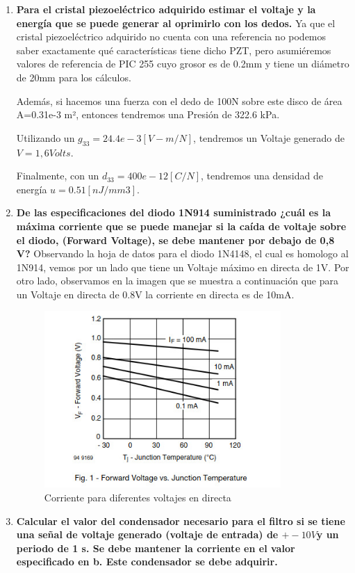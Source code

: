 \documentclass[journal,transmag]{IEEEtran}
\begin{document}
\begin{enumerate}[]
  \item \textbf{Para el cristal piezoeléctrico adquirido estimar el voltaje y la energía que se puede generar al oprimirlo con los dedos.}
Ya que el cristal piezoeléctrico adquirido no cuenta con una referencia no podemos saber exactamente qué características tiene dicho PZT, pero asumiéremos valores de referencia de PIC 255 cuyo grosor es de 0.2mm y tiene un diámetro de 20mm para los cálculos.  

Además, si hacemos una fuerza con el dedo de 100N sobre este disco de área A=0.31e-3 m², entonces tendremos una Presión de 322.6 kPa.  

Utilizando un $g_33= 24.4e-3 [V-m/N] $,  tendremos un Voltaje generado de $V=1,6 Volts$. 

Finalmente, con un $d_33=400e-12 [C/N]$, tendremos una densidad de energía $u= 0.51 [nJ/mm3]$. 

  \item \textbf{De las especificaciones del diodo 1N914 suministrado ¿cuál es la máxima corriente que se puede manejar si la caída de voltaje sobre el diodo, (Forward Voltage), se debe mantener por debajo de 0,8 V?}
Observando la hoja de datos para el diodo 1N4148, el cual es homologo al 1N914, vemos por un lado que tiene un Voltaje máximo en directa de 1V. Por otro lado, observamos en la imagen que se muestra a continuación que para un Voltaje en directa de 0.8V la corriente en directa es de 10mA. 

\begin{figure}[!h]
    \center
    \includegraphics[width=9cm]{imgs/s1.jpeg}
    \caption{Corriente para diferentes voltajes en directa}
    \label{1}
\end{figure}

  \item \textbf{Calcular el valor del condensador necesario para el filtro si se tiene una señal de voltaje generado (voltaje de entrada) de $+- 10 V $y un periodo de 1 s. Se debe mantener la corriente en el valor especificado en b. Este condensador se debe adquirir. }


\end{enumerate}
\end{document}
